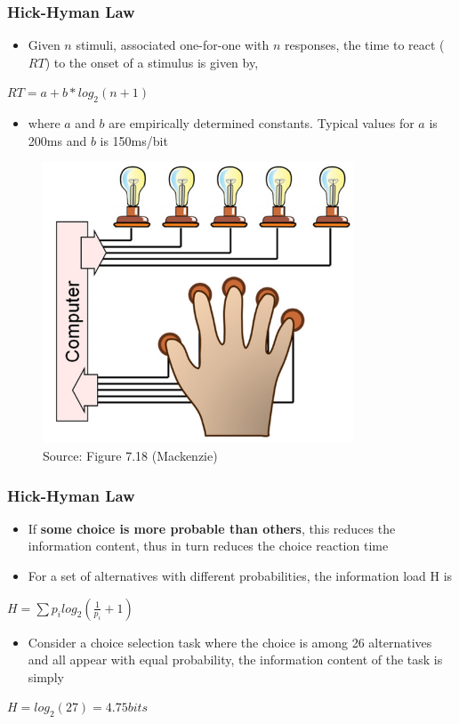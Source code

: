 \documentclass{beamer}
\begin{document}
\begin{frame}
	\frametitle{Hick-Hyman Law}
	\begin{itemize}
		\item Given $n$ stimuli, associated one-for-one with $n$ responses, the time to react ($RT$) to the onset of a stimulus is given by,
	\end{itemize}
		\centering
		$RT = a + b * log_{2}\left ( n + 1 \right )$
		\vspace{3pt}
	\begin{itemize}
		\item where $a$ and $b$ are empirically determined constants.  Typical values for $a$ is 200ms and $b$ is 150ms/bit
 	\end{itemize}		
	\begin{figure}
		\centering
		\includegraphics[width=.3\linewidth]{image/7-18}
		\caption{Source: Figure 7.18 (Mackenzie)}
	\end{figure}
\end{frame}

\begin{frame}
	\frametitle{Hick-Hyman Law}
	\begin{itemize}
		\item If \textbf{some choice is more probable than others}, this reduces the information content, thus in turn reduces the choice reaction time
		\item For a set of alternatives with different probabilities, the information load H is 
	\end{itemize}
	\centering
	$H = \sum p_{i}log_{2}\left ( \frac{1}{p_{i}} + 1 \right )$
	\begin{itemize}
		\item Consider a choice selection task where the choice is among 26 alternatives and all appear with equal probability, the information content of the task is simply
	\end{itemize}
	$H = log_{2}\left ( 27 \right ) = 4.75 bits$
\end{frame}
\end{document}
